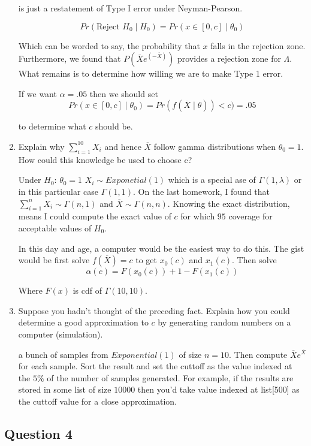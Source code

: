 \documentclass{tufte-book}
\theoremstyle{mytheoremstyle}
\theoremstyle{mylemstyle}
\theoremstyle{mydefstyle}
\begin{document}
\begin{enumerate}
 is just a restatement of Type I error under Neyman-Pearson.

\[Pr(\text{Reject }H_0 \mid H_0) = Pr(x \in [0, c] \mid \theta_0) \]

Which can be worded to say, the probability that $x$ falls in the rejection zone.  Furthermore, we found that $P(\overline{X} e^{(-\overline{X})})$ provides a rejection zone for $\Lambda$.  What remains is to determine how willing we are to make Type 1 error.

If we want $\alpha=.05$ then we should set
\[ Pr(x \in [0, c] \mid \theta_0) = Pr(f(\overline{X} \mid \theta)) < c) = .05 \]

to determine what $c$ should be.

\item Explain why $\sum_{i=1}^10 X_i$ and hence $\overline{X}$ follow gamma distributions when $\theta_0=1$.  How could this knowledge be used to choose c?

Under $H_0$: $\theta_0=1$ $X_i \sim Exponetial(1)$ which is a special ase of $\Gamma(1,\lambda)$ or in this particular case $\Gamma(1,1)$.  On the last homework, I found that $\sum_{i=1}^n X_i \sim \Gamma(n,1)$ and $\overline{X} \sim \Gamma(n,n)$.  Knowing the exact distribution, means I could compute the exact value of $c$ for which $95$ coverage for acceptable values of $H_0$.

In this day and age, a computer would be the easiest way to do this.  The gist would be first solve $f(\overline{X})=c$ to get $x_0(c)$ and $x_1(c)$.  Then solve
\[ \alpha(c) = F(x_0(c)) + 1-F(x_1(c)) \]

Where $F(x)$ is cdf of $\Gamma(10,10)$.

\item Suppose you hadn't thought of the preceding fact.  Explain how you could determine a good approximation to $c$ by generating random numbers on a computer (simulation).

 a bunch of samples from $Exponential(1)$ of size $n=10$.  Then compute $\overline{X}e^{\overline{X}}$ for each sample. Sort the result and set the cuttoff as the value indexed at the $5\%$ of the number of samples generated.  For example, if the results are stored in some list of size $10000$ then you'd take value indexed at list[500] as the cuttoff value for a close approximation.
\end{enumerate}

\subsection{Question 4}
\end{document}
